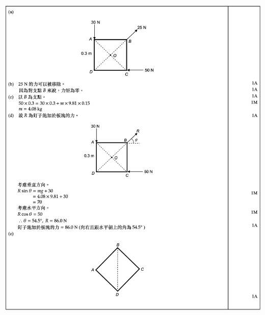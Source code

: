 {    %
    \par{\par\centering\includegraphics[width=\textwidth]{./img/ch3_moment_lq_2024-05-11-19-29-19.png}\par}
}

